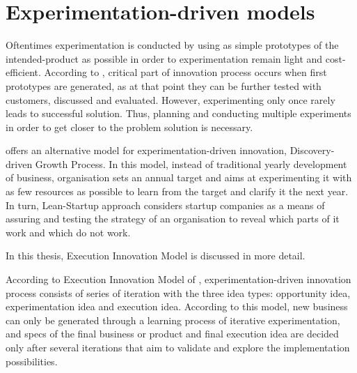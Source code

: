 \section{Experimentation-driven models}
Oftentimes experimentation is conducted by using as simple prototypes of the intended-product as possible in order to experimentation remain light and cost-efficient. According to \citet{thomke2001enlightened}, critical part of innovation process occurs when first prototypes are generated, as at that point they can be further tested with customers, discussed and evaluated. However, experimenting only once rarely leads to successful solution. Thus, planning and conducting multiple experiments in order to get closer to the problem solution is necessary. \citep{thomke1998modes} 

\citet{mcgrath2010business} offers an alternative model for experimentation-driven innovation, Discovery-driven Growth Process. In this model, instead of traditional yearly development of business, organisation sets an annual target and aims at experimenting it with as few resources as possible to learn from the target and clarify it the next year. In turn, Lean-Startup approach considers startup companies as a means of assuring and testing the strategy of an organisation to reveal which parts of it work and which do not work. \citep{ries2011lean}

In this thesis, Execution Innovation Model is discussed in more detail. 

According to Execution Innovation Model of \citet{tuulenmaki2011art}, experimentation-driven innovation process consists of series of iteration with the three idea types: opportunity idea, experimentation idea and execution idea. According to this model, new business can only be generated through a learning process of iterative experimentation, and specs of the final business or product and final execution idea are decided only after several iterations that aim to validate and explore the implementation possibilities. \citep{tuulenmaki2011art} 

